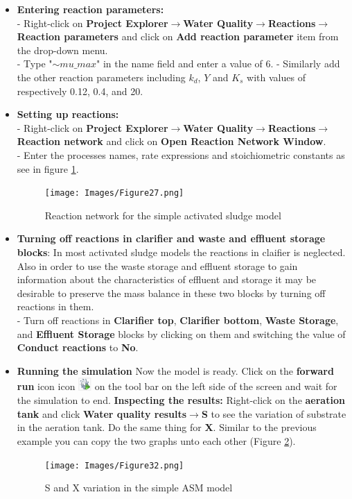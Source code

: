 \begin{itemize}
\item \textbf{Entering reaction parameters: }\\
- Right-click on \textbf{Project Explorer}$\rightarrow$\textbf{Water Quality}$\rightarrow$\textbf{Reactions}$\rightarrow$\textbf{Reaction parameters} and click on \textbf{Add reaction parameter} item from the drop-down menu. \\
- Type "$\sim mu\_max$" in the name field and enter a value of 6. 
- Similarly add the other reaction parameters including $k_d$, $Y$ and $K_s$ with values of respectively 0.12, 0.4, and 20. 
\item \textbf{Setting up reactions: }\\
- Right-click on \textbf{Project Explorer}$\rightarrow$\textbf{Water Quality}$\rightarrow$\textbf{Reactions}$\rightarrow$\textbf{Reaction network} and click on \textbf{Open Reaction Network Window}. \\
- Enter the processes names, rate expressions and stoichiometric constants as see in figure \ref{fig:27}.
\begin{figure}
\begin{center}
\texttt{[image: Images/Figure27.png]} \\
\caption{Reaction network for the simple activated sludge model}\label{fig:27}
\end{center}
\end{figure}
\item \textbf{Turning off reactions in clarifier and waste and effluent storage blocks}: In most activated sludge models the reactions in claifier is neglected. Also in order to use the waste storage and effluent storage to gain information about the characteristics of effluent and storage it may be desirable to preserve the mass balance in these two blocks by turning off reactions in them. \\
- Turn off reactions in \textbf{Clarifier top}, \textbf{Clarifier bottom}, \textbf{Waste Storage}, and \textbf{Effluent Storage} blocks by clicking on them and switching the value of \textbf{Conduct reactions} to \textbf{No}. \\
\item \textbf{Running the simulation} Now the model is ready. Click on the \textbf{forward run} icon icon \includegraphics[width=0.5cm]{Icons/run_icon.png} on the tool bar on the left side of the screen and wait for the simulation to end. 
\textbf{Inspecting the results: } Right-click on the \textbf{aeration tank} and click \textbf{Water quality results}$\rightarrow$\textbf{S} to see the variation of substrate in the aeration tank. Do the same thing for \textbf{X}. Similar to the previous example you can copy the two graphs unto each other (Figure \ref{fig:32}). 
\begin{figure}
\begin{center}
\texttt{[image: Images/Figure32.png]} \\
\caption{S and X variation in the simple ASM model}\label{fig:32}
\end{center}
\end{figure}

\end{itemize}
